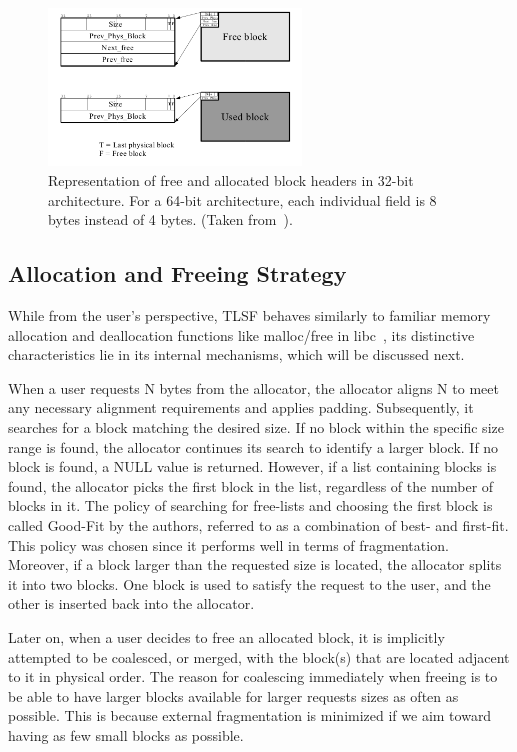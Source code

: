 \begin{figure}[H]
    \centering
    \includegraphics[width=0.60\textwidth]{figures/blockheader_reference.png}
    \caption{Representation of free and allocated block headers in 32-bit architecture. For a 64-bit architecture, each individual field is 8 bytes instead of 4 bytes. (Taken from~\cite{TLSF}).}
    \label{fig:blockheader_reference}
\end{figure}

\subsection{Allocation and Freeing Strategy}

While from the user's perspective, TLSF behaves similarly to familiar memory allocation and deallocation functions like malloc/free in libc~\cite{mallocman}, its distinctive characteristics lie in its internal mechanisms, which will be discussed next.

When a user requests N bytes from the allocator, the allocator aligns N to meet any necessary alignment requirements and applies padding. Subsequently, it searches for a block matching the desired size. If no block within the specific size range is found, the allocator continues its search to identify a larger block. If no block is found, a NULL value is returned. However, if a list containing blocks is found, the allocator picks the first block in the list, regardless of the number of blocks in it. The policy of searching for free-lists and choosing the first block is called Good-Fit by the authors, referred to as a combination of best- and first-fit. This policy was chosen since it performs well in terms of fragmentation. Moreover, if a block larger than the requested size is located, the allocator splits it into two blocks. One block is used to satisfy the request to the user, and the other is inserted back into the allocator.

Later on, when a user decides to free an allocated block, it is implicitly attempted to be coalesced, or merged, with the block(s) that are located adjacent to it in physical order. The reason for coalescing immediately when freeing is to be able to have larger blocks available for larger requests sizes as often as possible. This is because external fragmentation is minimized if we aim toward having as few small blocks as possible.

